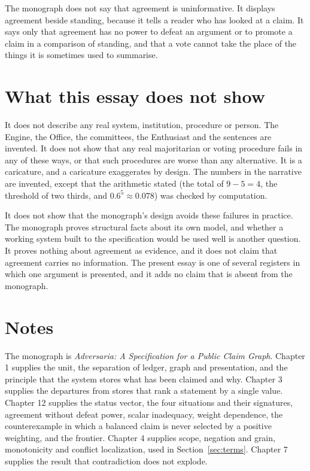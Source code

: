 \documentclass[11pt]{article}
\begin{document}
The monograph does not say that agreement is uninformative. It displays agreement beside standing, because it tells a reader who has looked at a claim. It says only that agreement has no power to defeat an argument or to promote a claim in a comparison of standing, and that a vote cannot take the place of the things it is sometimes used to summarise.

\section{What this essay does not show}\label{sec:limits}

It does not describe any real system, institution, procedure or person. The Engine, the Office, the committees, the Enthusiast and the sentences are invented. It does not show that any real majoritarian or voting procedure fails in any of these ways, or that such procedures are worse than any alternative. It is a caricature, and a caricature exaggerates by design. The numbers in the narrative are invented, except that the arithmetic stated (the total of $9-5=4$, the threshold of two thirds, and $0.6^5\approx0.078$) was checked by computation.

It does not show that the monograph's design avoids these failures in practice. The monograph proves structural facts about its own model, and whether a working system built to the specification would be used well is another question. It proves nothing about agreement as evidence, and it does not claim that agreement carries no information. The present essay is one of several registers in which one argument is presented, and it adds no claim that is absent from the monograph.

\section*{Notes}

The monograph is \emph{Adversaria: A Specification for a Public Claim Graph}. Chapter 1 supplies the unit, the separation of ledger, graph and presentation, and the principle that the system stores what has been claimed and why. Chapter 3 supplies the departures from stores that rank a statement by a single value. Chapter 12 supplies the status vector, the four situations and their signatures, agreement without defeat power, scalar inadequacy, weight dependence, the counterexample in which a balanced claim is never selected by a positive weighting, and the frontier. Chapter 4 supplies scope, negation and grain, monotonicity and conflict localization, used in Section~\ref{sec:terms}. Chapter 7 supplies the result that contradiction does not explode.
\end{document}
